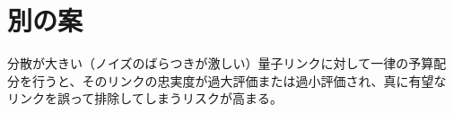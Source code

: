\documentclass[conference]{IEEEtran}
\begin{document}
\section{別の案}
\label{sec:org06a7025}
分散が大きい（ノイズのばらつきが激しい）量子リンクに対して一律の予算配
分を行うと、そのリンクの忠実度が過大評価または過小評価され、真に有望な
リンクを誤って排除してしまうリスクが高まる。
\end{document}
